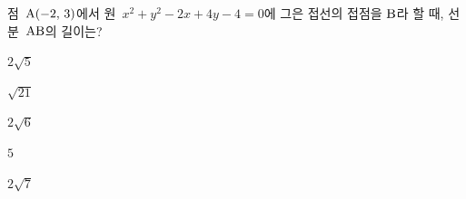 점~$\mathrm{A}(-2,\,3)$에서 원~$x^2+y^2-2x+4y-4=0$에 그은 접선의 접점을 $\mathrm{B}$라 할 때, 선분~$\mathrm{AB}$의 길이는?
\begin{choices32}{\rule[-3ex]{0pt}{8ex}$2\sqrt{5}$}{\rule[-3ex]{0pt}{8ex}$\sqrt{21}$}{\rule[-3ex]{0pt}{8ex}$2\sqrt{6}$}{\rule[-3ex]{0pt}{8ex}$5$}{\rule[-3ex]{0pt}{8ex}$2\sqrt{7}$}\end{choices32}
